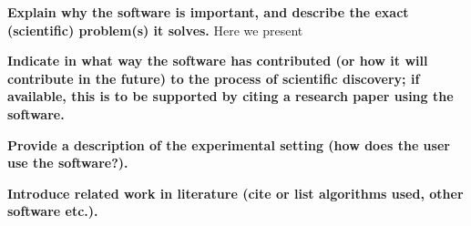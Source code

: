 \textbf{Explain why the software is important, and describe the exact (scientific) problem(s) it solves.}
Here we present 


\textbf{Indicate in what way the software has contributed (or how it will contribute in the future) to the process of scientific discovery; if available, this is to be supported by citing a research paper using the software.}


\textbf{Provide a description of the experimental setting (how does the user use the software?).}


\textbf{Introduce related work in literature (cite or list algorithms used, other software etc.).}

    
    
    
    
    
    
    
    
    
    
    
    
    
    
    
    